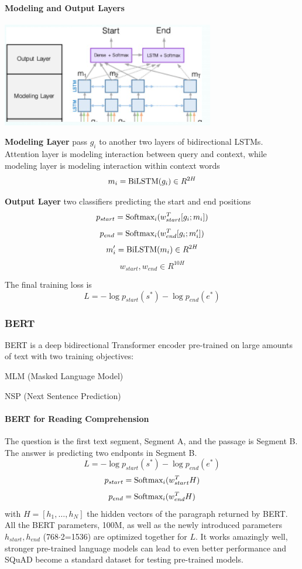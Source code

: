 \documentclass[10pt]{report}
\begin{document}
\paragraph{Modeling and Output Layers}
\begin{center}
	\includegraphics[scale=0.5]{127.png}
\end{center}
\begin{list}{}{}
	\item \textbf{Modeling Layer} pass $g_i$ to another two layers of bidirectional LSTMs.\\
	Attention layer is modeling interaction between query and context, while modeling layer is modeling interaction within context words
	$$m_i=\hbox{BiLSTM}(g_i) \in R^{2H}$$
	\item \textbf{Output Layer} two classifiers predicting the start and end positions
	$$p_{start} = \hbox{Softmax}_i(w_{start}^T[g_i;m_i])$$
	$$p_{end} = \hbox{Softmax}_i(w_{end}^T[g_i;m'_i])$$
	$$m'_i = \hbox{BiLSTM}(m_i)\in R^{2H}$$
	$$w_{start},w_{end}\in R^{10H}$$
\end{list}
The final training loss is
$$L= - \log p_{start}(s^*) - \log p_{end}(e^*)$$
\pagebreak
\subsubsection{BERT}
BERT is a deep bidirectional Transformer encoder pre-trained on large amounts of text with two training objectives:
\begin{list}{}{}
	\item MLM (Masked Language Model)
	\item NSP (Next Sentence Prediction)
\end{list}
\paragraph{BERT for Reading Comprehension}
The question is the first text segment, Segment A, and the passage is Segment B. The answer is predicting two endponts in Segment B.
$$L= - \log p_{start}(s^*) - \log p_{end}(e^*)$$
$$p_{start} = \hbox{Softmax}_i(w_{start}^TH)$$
$$p_{end} = \hbox{Softmax}_i(w_{end}^TH)$$
with $H = [h_1,\ldots,h_N]$ the hidden vectors of the paragraph returned by BERT.\\
All the BERT parameters, 100M, as well as the newly introduced parameters $h_{start},h_{end}$ (768$\cdot$2=1536) are optimized together for $L$. It works amazingly well, stronger pre-trained language models can lead to even better performance and SQuAD become a standard dataset for testing pre-trained models.
\end{document}
